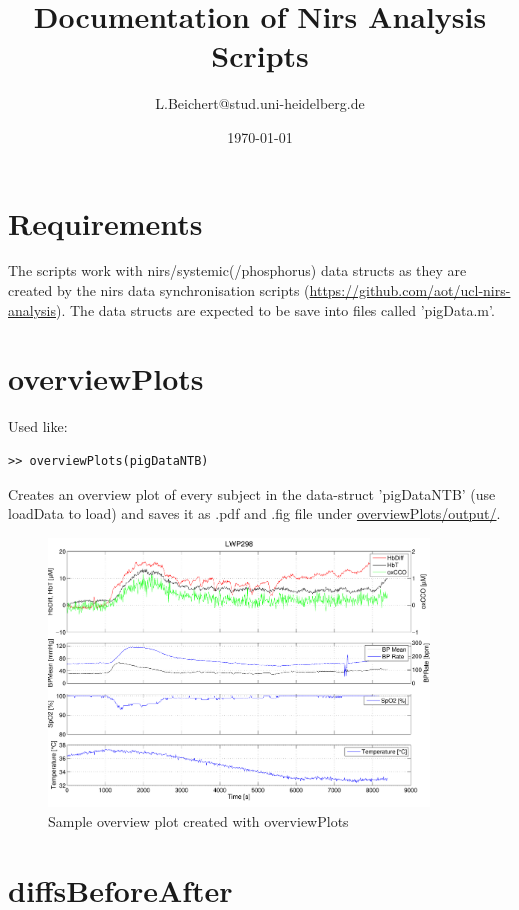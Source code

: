 \documentclass[10pt, a4paper]{article}
\title{Documentation of Nirs Analysis Scripts}
\author{L.Beichert@stud.uni-heidelberg.de}
\date{\today}
\begin{document}
\maketitle

\section{Requirements}
The scripts work with nirs/systemic(/phosphorus) data structs as they are created by the nirs data synchronisation scripts (\url{https://github.com/aot/ucl-nirs-analysis}).
The data structs are expected to be save into files called 'pigData.m'.

\section{overviewPlots}
Used like:

\begin{lstlisting}
>> overviewPlots(pigDataNTB)
\end{lstlisting}

Creates an overview plot of every subject in the data-struct 'pigDataNTB' (use loadData to load) and saves it as .pdf and .fig file under \url{overviewPlots/output/}.

\begin{figure}[h]
\includegraphics[width=0.9\textwidth]{LWP298_Argon_Raw.pdf}
\caption{Sample overview plot created with overviewPlots}
\end{figure}


\section{diffsBeforeAfter}
\end{document}
